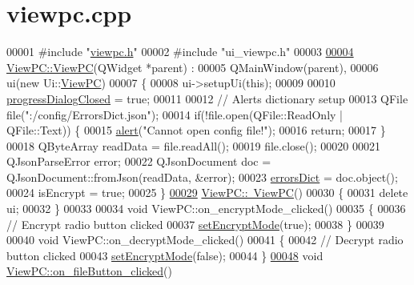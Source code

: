 \hypertarget{viewpc_8cpp_source}{\section{viewpc.\-cpp}
}

\begin{DoxyCode}
00001 \textcolor{preprocessor}{#include "\hyperlink{viewpc_8h}{viewpc.h}"}
00002 \textcolor{preprocessor}{#include "ui\_viewpc.h"}
00003 
\hypertarget{viewpc_8cpp_source_l00004}{}\hyperlink{class_view_p_c_a33c96c61f61042319c66c19059836b7f}{00004} \hyperlink{class_view_p_c_a33c96c61f61042319c66c19059836b7f}{ViewPC::ViewPC}(QWidget *parent) :
00005     QMainWindow(parent),
00006     ui(new Ui::\hyperlink{class_view_p_c}{ViewPC})
00007 \{
00008     ui->setupUi(\textcolor{keyword}{this});
00009 
00010     \hyperlink{class_view_p_c_add8c82aa2b0b934212aa5bde9277ab36}{progressDialogClosed} = \textcolor{keyword}{true};
00011 
00012     \textcolor{comment}{// Alerts dictionary setup}
00013     QFile file(\textcolor{stringliteral}{":/config/ErrorsDict.json"});
00014     \textcolor{keywordflow}{if}(!file.open(QFile::ReadOnly | QFile::Text)) \{
00015         \hyperlink{class_view_p_c_a7c467169467789561078abc9d4fe57bd}{alert}(\textcolor{stringliteral}{"Cannot open config file!"});
00016         \textcolor{keywordflow}{return};
00017     \}
00018     QByteArray readData = file.readAll();
00019     file.close();
00020 
00021     QJsonParseError error;
00022     QJsonDocument doc = QJsonDocument::fromJson(readData, &error);
00023     \hyperlink{class_view_p_c_a26f90436aca32e5bad46f5e69a7e7e09}{errorsDict} = doc.object();
00024     isEncrypt = \textcolor{keyword}{true};
00025 \}
\hypertarget{viewpc_8cpp_source_l00029}{}\hyperlink{class_view_p_c_a91c51f5c1e6ed5ab12b410339f469b0f}{00029} \hyperlink{class_view_p_c_a91c51f5c1e6ed5ab12b410339f469b0f}{ViewPC::~ViewPC}()
00030 \{
00031     \textcolor{keyword}{delete} ui;
00032 \}
00033 
00034 \textcolor{keywordtype}{void} ViewPC::on\_encryptMode\_clicked()
00035 \{
00036     \textcolor{comment}{// Encrypt radio button clicked}
00037     \hyperlink{class_view_p_c_a5b48951efefdc0e3039c9a4bf185320b}{setEncryptMode}(\textcolor{keyword}{true});
00038 \}
00039 
00040 \textcolor{keywordtype}{void} ViewPC::on\_decryptMode\_clicked()
00041 \{
00042     \textcolor{comment}{// Decrypt radio button clicked}
00043     \hyperlink{class_view_p_c_a5b48951efefdc0e3039c9a4bf185320b}{setEncryptMode}(\textcolor{keyword}{false});
00044 \}
\hypertarget{viewpc_8cpp_source_l00048}{}\hyperlink{class_view_p_c_a3b9b7a7be9702d8b160f257f1c74a776}{00048} \textcolor{keywordtype}{void} \hyperlink{class_view_p_c_a3b9b7a7be9702d8b160f257f1c74a776}{ViewPC::on\_fileButton\_clicked}()

\end{DoxyCode}
